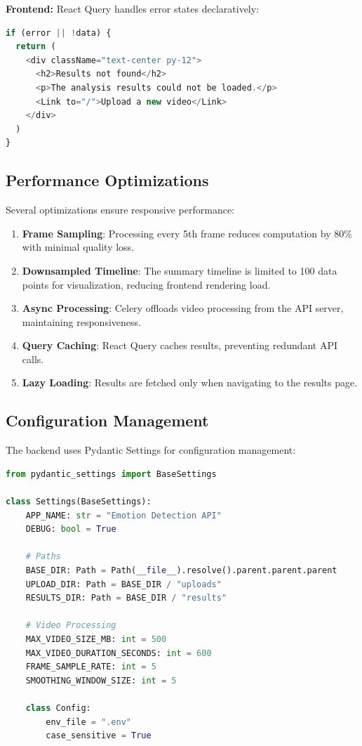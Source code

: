 \textbf{Frontend:} React Query handles error states declaratively:

\begin{lstlisting}[language=TypeScript, caption={Frontend error display}]
if (error || !data) {
  return (
    <div className="text-center py-12">
      <h2>Results not found</h2>
      <p>The analysis results could not be loaded.</p>
      <Link to="/">Upload a new video</Link>
    </div>
  )
}
\end{lstlisting}

\subsection{Performance Optimizations}

Several optimizations ensure responsive performance:

\begin{enumerate}
    \item \textbf{Frame Sampling}: Processing every 5th frame reduces computation by 80\% with minimal quality loss.

    \item \textbf{Downsampled Timeline}: The summary timeline is limited to 100 data points for visualization, reducing frontend rendering load.

    \item \textbf{Async Processing}: Celery offloads video processing from the API server, maintaining responsiveness.

    \item \textbf{Query Caching}: React Query caches results, preventing redundant API calls.

    \item \textbf{Lazy Loading}: Results are fetched only when navigating to the results page.
\end{enumerate}

\subsection{Configuration Management}

The backend uses Pydantic Settings for configuration management:

\begin{lstlisting}[language=Python, caption={Configuration with Pydantic Settings}]
from pydantic_settings import BaseSettings

class Settings(BaseSettings):
    APP_NAME: str = "Emotion Detection API"
    DEBUG: bool = True

    # Paths
    BASE_DIR: Path = Path(__file__).resolve().parent.parent.parent
    UPLOAD_DIR: Path = BASE_DIR / "uploads"
    RESULTS_DIR: Path = BASE_DIR / "results"

    # Video Processing
    MAX_VIDEO_SIZE_MB: int = 500
    MAX_VIDEO_DURATION_SECONDS: int = 600
    FRAME_SAMPLE_RATE: int = 5
    SMOOTHING_WINDOW_SIZE: int = 5

    class Config:
        env_file = ".env"
        case_sensitive = True
\end{lstlisting}

